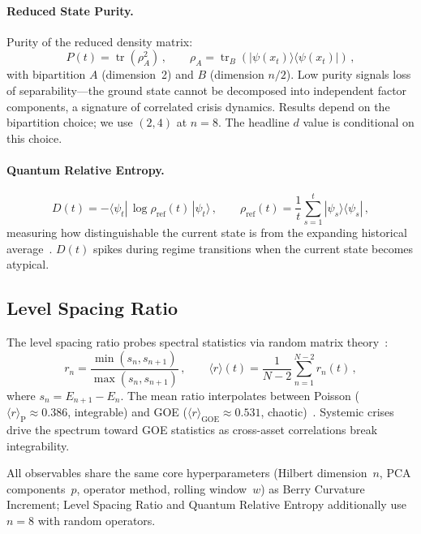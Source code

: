 \documentclass[3p]{elsarticle}
\newcommand{\ket}[1]{|#1\rangle}
\newcommand{\bra}[1]{\langle#1|}
\newcommand{\tr}{\operatorname{tr}}
\begin{document}
\paragraph{Reduced State Purity.}
Purity of the reduced density matrix:
\begin{equation}\label{eq:reduced_purity}
  P(t) = \tr(\rho_A^2)\,,\qquad \rho_A = \tr_B(\ket{\psi(x_t)}\bra{\psi(x_t)})\,,
\end{equation}
with bipartition $A$ (dimension~2) and $B$ (dimension $n/2$).
Low purity signals loss of separability---the ground state cannot be
decomposed into independent factor components, a signature of
correlated crisis dynamics.  Results depend on the bipartition
choice; we use $(2, 4)$ at $n = 8$.  The headline $d$ value is
conditional on this choice.

\paragraph{Quantum Relative Entropy.}
\begin{equation}\label{eq:qre}
  D(t) = -\langle\psi_t|\,\log\rho_{\mathrm{ref}}(t)\,|\psi_t\rangle\,,
  \qquad
  \rho_{\mathrm{ref}}(t)
    = \frac{1}{t}\sum_{s=1}^{t}|\psi_s\rangle\langle\psi_s|\,,
\end{equation}
measuring how distinguishable the current state is from the
expanding historical average~\cite{umegaki1962,vedral2002}.
$D(t)$ spikes during regime transitions when the current
state becomes atypical.

\subsection{Level Spacing Ratio}\label{subsec:level_spacing}

The level spacing ratio probes spectral statistics via random
matrix theory~\cite{oganesyan2007}:
\begin{equation}\label{eq:level_spacing}
  r_n = \frac{\min(s_n, s_{n+1})}{\max(s_n, s_{n+1})}\,,
  \qquad
  \langle r\rangle(t) = \frac{1}{N-2}\sum_{n=1}^{N-2} r_n(t)\,,
\end{equation}
where $s_n = E_{n+1} - E_n$.  The mean ratio interpolates between
Poisson ($\langle r\rangle_{\mathrm{P}} \approx 0.386$, integrable)
and GOE ($\langle r\rangle_{\mathrm{GOE}} \approx 0.531$,
chaotic)~\cite{atas2013}.  Systemic crises drive the spectrum toward
GOE statistics as cross-asset correlations break integrability.

\noindent All observables share the same core hyperparameters (Hilbert
dimension~$n$, PCA components~$p$, operator method, rolling
window~$w$) as Berry Curvature Increment; Level Spacing Ratio and
Quantum Relative Entropy additionally use $n = 8$ with random
operators.
\end{document}
